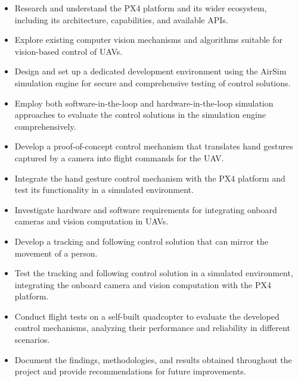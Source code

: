 \begin{itemize}
    \item Research and understand the PX4 platform and its wider ecosystem, including its architecture, capabilities, and available APIs.
    \item Explore existing computer vision mechanisms and algorithms suitable for vision-based control of UAVs.
    \item Design and set up a dedicated development environment using the AirSim simulation engine for secure and comprehensive testing of control solutions.
    \item Employ both software-in-the-loop and hardware-in-the-loop simulation approaches to evaluate the control solutions in the simulation engine comprehensively.
    \item Develop a proof-of-concept control mechanism that translates hand gestures captured by a camera into flight commands for the UAV.
    \item Integrate the hand gesture control mechanism with the PX4 platform and test its functionality in a simulated environment.
    \item Investigate hardware and software requirements for integrating onboard cameras and vision computation in UAVs.
    \item Develop a tracking and following control solution that can mirror the movement of a person.
    \item Test the tracking and following control solution in a simulated environment, integrating the onboard camera and vision computation with the PX4 platform.
    \item Conduct flight tests on a self-built quadcopter to evaluate the developed control mechanisms, analyzing their performance and reliability in different scenarios.
    \item Document the findings, methodologies, and results obtained throughout the project and provide recommendations for future improvements.
\end{itemize}


